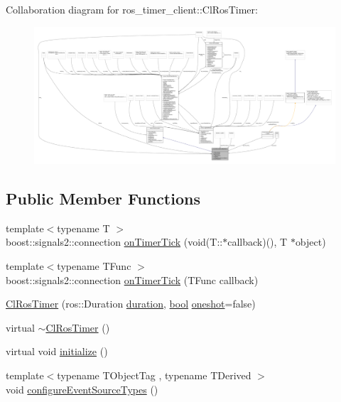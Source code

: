 Collaboration diagram for ros\+\_\+timer\+\_\+client\+:\+:Cl\+Ros\+Timer\+:
\nopagebreak
\begin{figure}[H]
\begin{center}
\leavevmode
\includegraphics[width=350pt]{classros__timer__client_1_1ClRosTimer__coll__graph}
\end{center}
\end{figure}
\subsection*{Public Member Functions}
\begin{DoxyCompactItemize}
\item 
{\footnotesize template$<$typename T $>$ }\\boost\+::signals2\+::connection \hyperlink{classros__timer__client_1_1ClRosTimer_a06ecf6427b5df59f29879ab3bd1f120c}{on\+Timer\+Tick} (void(T\+::$\ast$callback)(), T $\ast$object)
\item 
{\footnotesize template$<$typename T\+Func $>$ }\\boost\+::signals2\+::connection \hyperlink{classros__timer__client_1_1ClRosTimer_a0ad81e975f7ea9f4b8e947663109c0eb}{on\+Timer\+Tick} (T\+Func callback)
\item 
\hyperlink{classros__timer__client_1_1ClRosTimer_a7a8cde0adf8d957dc0fe20f38b6ae1bd}{Cl\+Ros\+Timer} (ros\+::\+Duration \hyperlink{classros__timer__client_1_1ClRosTimer_a79df7a52481e520ba959f3e6afb0a817}{duration}, \hyperlink{classbool}{bool} \hyperlink{classros__timer__client_1_1ClRosTimer_a767e8c7723206bd7a0a49f660418d628}{oneshot}=false)
\item 
virtual \hyperlink{classros__timer__client_1_1ClRosTimer_a099e3ba0adbd67092703bd5c776d6c3f}{$\sim$\+Cl\+Ros\+Timer} ()
\item 
virtual void \hyperlink{classros__timer__client_1_1ClRosTimer_a2d290d2a5d0afa7cdab543b17dbddbff}{initialize} ()
\item 
{\footnotesize template$<$typename T\+Object\+Tag , typename T\+Derived $>$ }\\void \hyperlink{classros__timer__client_1_1ClRosTimer_aab7de28c1ae3d58090fd6031a9b5bc54}{configure\+Event\+Source\+Types} ()
\end{DoxyCompactItemize}

